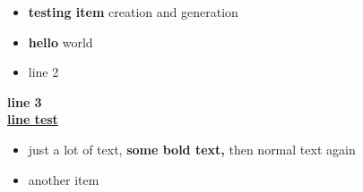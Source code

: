 \documentclass[10pt]{article}
\begin{document}
\begin{itemize}
\item \textbf{testing item} creation and generation
\item \textbf{hello} world
\item line 2
\end{itemize}
\textbf{line 3}\\ 
\underline{\textbf{line test}}\\ 
\begin{itemize}
\item just a lot of text, \textbf{some bold text,} then normal text again
\item another item
\end{itemize}
\end{document}
